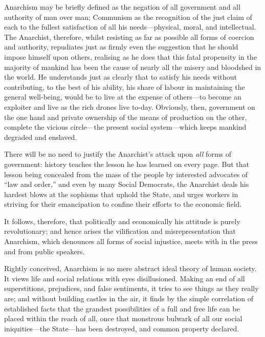 \documentclass[oneside]{book}
\begin{document}

Anarchism may be briefly defined as the negation of all
government and all authority of man over man; Communism
as the recognition of the just claim of each to the fullest satisfaction
of all his needs---physical, moral, and intellectual. The
Anarchist, therefore, whilst resisting as far as possible all forms
of coercion and authority, repudiates just as firmly even the
suggestion that he should impose himself upon others, realising
as he does that this fatal propensity in the majority of mankind
has been the cause of nearly all the misery and bloodshed in the
world. He understands just as clearly that to satisfy his needs
without contributing, to the best of his ability, his share of
labour in maintaining the general well-being, would be to live at
the expense of others---to become an exploiter and live as the
rich drones live to-day. Obviously, then, government on the one
hand and private ownership of the means of production on the
other, complete the vicious circle---the present social system---which
keeps mankind degraded and enslaved.

There will be no need to justify the Anarchist's attack upon
\textit{all} forms of government: history teaches the lesson he has
learned on every page. But that lesson being concealed from
the mass of the people by interested advocates of ``law and
order,'' and even by many Social Democrats, the Anarchist deals
\newpage\noindent
his hardest blows at the sophisms that uphold the State, and
urges workers in striving for their emancipation to confine their
efforts to the economic field.

It follows, therefore, that politically and economically his
attitude is purely revolutionary; and hence arises the vilification
and misrepresentation that Anarchism, which denounces all
forms of social injustice, meets with in the press and from
public speakers.

Rightly conceived, Anarchism is no mere abstract ideal
theory of human society. It views life and social relations
with eyes disillusioned. Making an end of all superstitions,
prejudices, and false sentiments, it tries to see things as they
really are; and without building castles in the air, it finds by
the simple correlation of established facts that the grandest
possibilities of a full and free life can be placed within the
reach of all, once that monstrous bulwark of all our social
iniquities---the State---has been destroyed, and common property
declared.
\end{document}
